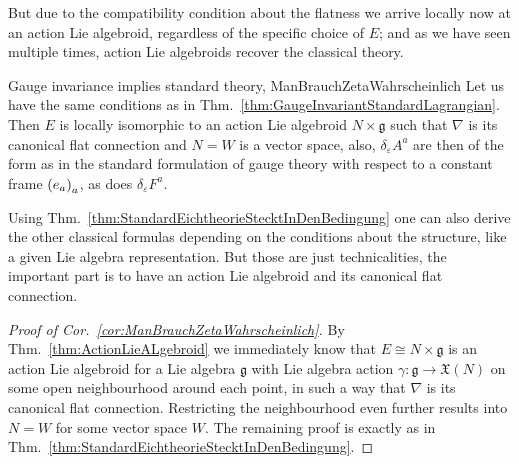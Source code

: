 But due to the compatibility condition about the flatness we arrive locally now at an action Lie algebroid, regardless of the specific choice of $E$; and as we have seen multiple times, action Lie algebroids recover the classical theory.

\begin{corollaries}{Gauge invariance implies standard theory, \newline \cite[the discussion around Eq.~(9)ff.]{CurvedYMH}}{ManBrauchZetaWahrscheinlich}
Let us have the same conditions as in Thm.~\ref{thm:GaugeInvariantStandardLagrangian}. Then $E$ is locally isomorphic to an action Lie algebroid $N \times \mathfrak{g}$ such that $\nabla$ is its canonical flat connection and $N =W$ is a vector space, also, $\delta_\varepsilon A^a$ are then of the form as in the standard formulation of gauge theory with respect to a constant frame $\mleft( e_a \mright)_a$, as does $\delta_\varepsilon F^a$.
\end{corollaries}

\begin{remark}
\leavevmode\newline
Using Thm.~\ref{thm:StandardEichtheorieStecktInDenBedingung} one can also derive the other classical formulas depending on the conditions about the structure, like a given Lie algebra representation. But those are just technicalities, the important part is to have an action Lie algebroid and its canonical flat connection.
\end{remark}

\begin{proof}[Proof of Cor.~\ref{cor:ManBrauchZetaWahrscheinlich}]
\leavevmode\newline
By Thm.~\ref{thm:ActionLieALgebroid} we immediately know that $E\cong N \times \mathfrak{g}$ is an action Lie algebroid for a Lie algebra $\mathfrak{g}$ with Lie algebra action $\gamma: \mathfrak{g} \to \mathfrak{X}(N)$ on some open neighbourhood around each point, in such a way that $\nabla$ is its canonical flat connection. Restricting the neighbourhood even further results into $N=W$ for some vector space $W$. The remaining proof is exactly as in Thm.~\ref{thm:StandardEichtheorieStecktInDenBedingung}.
\end{proof}

